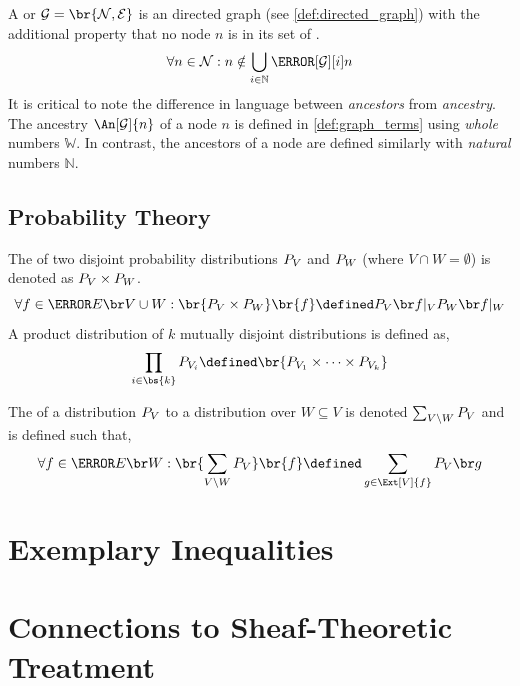 \documentclass[aps, 10pt, english, twoside, pra, nofootinbib, longbibliography]{revtex4-1}
\begin{document}
    \begin{definition}
        \label{def:dag}
        A  or  $\graph = \br{\nodes, \edges}$ is an directed graph (see \cref{def:directed_graph}) with the additional property that no node $n$ is in its set of .
        \[ \forall n \in \nodes : n \notin \bigcup_{i\in\mathbb{N}} \Pa[\graph][i]{n}\]
        It is critical to note the difference in language between \textit{ancestors} from \textit{ancestry}. The ancestry $\An[\graph]{n}$ of a node $n$ is defined in \cref{def:graph_terms} using \textit{whole} numbers $\mathbb{W}$. In contrast, the ancestors of a node are defined similarly with \textit{natural} numbers $\mathbb{N}$.
    \end{definition}

    \subsection{Probability Theory}

    \begin{definition}
        The  of two disjoint probability distributions $\prob[V]$ and $\prob[W]$ (where $V \cap W = \emptyset$) is denoted as $\prob[V] \times \prob[W]$.
        \[ \forall f \in \Events{V \cup W} : \br{\prob[V] \times \prob[W]}\br{f} \defined \prob[V][f|_{V}]\tcdot\prob[W][f|_{W}] \]
        A product distribution of $k$ mutually disjoint distributions is defined as,
        \[ \prod_{i\in\bs{k}} \prob[V_i] \defined \br{\prob[V_1] \times \cdots \times \prob[V_k]} \]
    \end{definition}

    \begin{definition}
        The  of a distribution $\prob[V]$ to a distribution over $W \subseteq V$ is denoted $\sum_{V \setminus W} \prob[V]$ and is defined such that,
        \[ \forall f \in \Events{W} : \br{\sum_{V \setminus W} \prob[V]}\br{f} \defined \sum_{g \in \Ext[V]{f}} \prob[V][g] \]
    \end{definition}

    \section{Exemplary Inequalities}
    \section{Connections to Sheaf-Theoretic Treatment}
\end{document}
